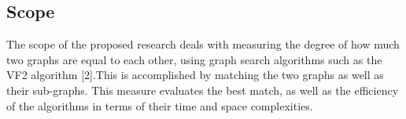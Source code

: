 \subsection{Scope}
The scope of the proposed research deals with measuring the degree of how much two graphs are equal to each other, using graph search algorithms such as the VF2 algorithm [2].This is accomplished by matching the two graphs as well as their sub-graphs.
This measure evaluates the best match, as well as the efficiency of the algorithms in terms of their time and space complexities.
\newpage
